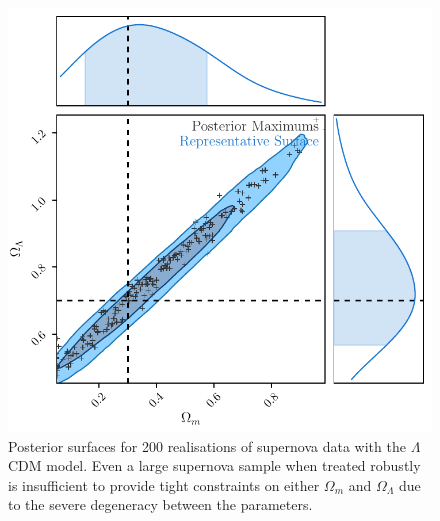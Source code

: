 \documentclass[a4paper,fleqn,usenatbib]{mnras}
\begin{document}
\begin{figure}
	\begin{center}
		\includegraphics[width=\columnwidth]{simpleApproximateModelOl.pdf}
	\end{center}
	\caption{Posterior surfaces for 200 realisations of supernova data with the $\Lambda$CDM model. Even a large supernova sample when treated robustly is insufficient to provide tight constraints on either $\Omega_m$ and $\Omega_\Lambda$ due to the severe degeneracy between the parameters.}
	\label{fig:simple_ol}
\end{figure}
\end{document}
